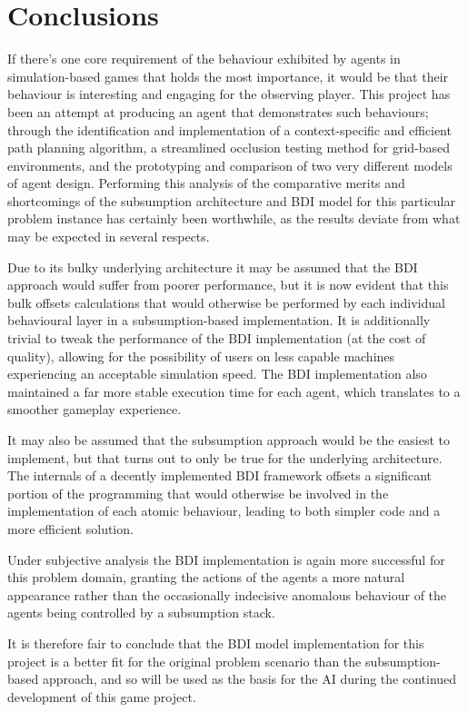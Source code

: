 \documentclass[a4paper,12pt]{article}
\begin{document}
\section{Conclusions}
\noindent
If there's one core requirement of the behaviour exhibited by agents in simulation-based games that holds the most importance, it would be that their behaviour is interesting and engaging for the observing player. This project has been an attempt at producing an agent that demonstrates such behaviours; through the identification and implementation of a context-specific and efficient path planning algorithm, a streamlined occlusion testing method for grid-based environments, and the prototyping and comparison of two very different models of agent design. Performing this analysis of the comparative merits and shortcomings of the subsumption architecture and BDI model for this particular problem instance has certainly been worthwhile, as the results deviate from what may be expected in several respects.

Due to its bulky underlying architecture it may be assumed that the BDI approach would suffer from poorer performance, but it is now evident that this bulk offsets calculations that would otherwise be performed by each individual behavioural layer in a subsumption-based implementation. It is additionally trivial to tweak the performance of the BDI implementation (at the cost of quality), allowing for the possibility of users on less capable machines experiencing an acceptable simulation speed. The BDI implementation also maintained a far more stable execution time for each agent, which translates to a smoother gameplay experience.

It may also be assumed that the subsumption approach would be the easiest to implement, but that turns out to only be true for the underlying architecture. The internals of a decently implemented BDI framework offsets a significant portion of the programming that would otherwise be involved in the implementation of each atomic behaviour, leading to both simpler code and a more efficient solution.

Under subjective analysis the BDI implementation is again more successful for this problem domain, granting the actions of the agents a more natural appearance rather than the occasionally indecisive anomalous behaviour of the agents being controlled by a subsumption stack.

It is therefore fair to conclude that the BDI model implementation for this project is a better fit for the original problem scenario than the subsumption-based approach, and so will be used as the basis for the AI during the continued development of this game project.
\end{document}

